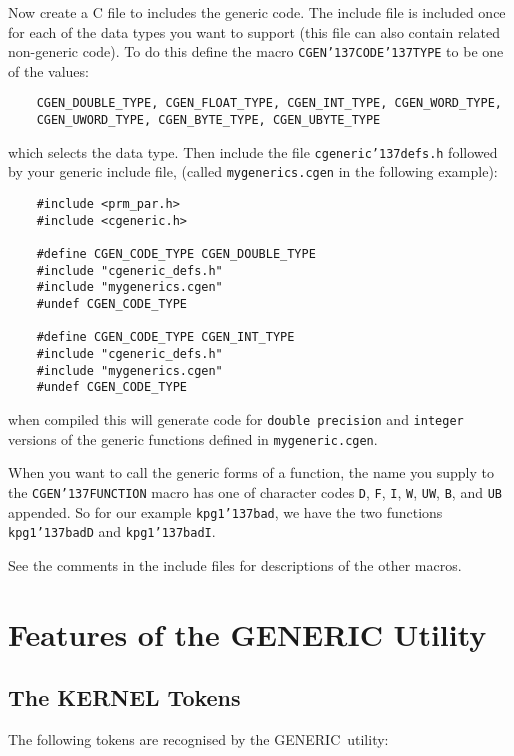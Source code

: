 \documentclass[twoside,11pt]{article}
\renewcommand{\_}{{\tt\char'137}}     %
\newcommand{\GENERIC}{{\footnotesize GENERIC}\normalsize}
\begin{document}
Now create a C file to includes the generic code. The include file is included
once for each of the data types you want to support (this file can also
contain related non-generic code).  To do this define the macro
{\tt CGEN\_CODE\_TYPE} to be one of the values:

\begin{verbatim}
    CGEN_DOUBLE_TYPE, CGEN_FLOAT_TYPE, CGEN_INT_TYPE, CGEN_WORD_TYPE,
    CGEN_UWORD_TYPE, CGEN_BYTE_TYPE, CGEN_UBYTE_TYPE
\end{verbatim}

which selects the data type. Then include the file {\tt cgeneric\_defs.h}
followed by your generic include file, (called {\tt mygenerics.cgen} in the
following example):

\begin{verbatim}
    #include <prm_par.h>
    #include <cgeneric.h>

    #define CGEN_CODE_TYPE CGEN_DOUBLE_TYPE
    #include "cgeneric_defs.h"
    #include "mygenerics.cgen"
    #undef CGEN_CODE_TYPE

    #define CGEN_CODE_TYPE CGEN_INT_TYPE
    #include "cgeneric_defs.h"
    #include "mygenerics.cgen"
    #undef CGEN_CODE_TYPE
\end{verbatim}

when compiled this will generate code for {\tt double precision}
and {\tt integer} versions of the generic functions defined in
{\tt mygeneric.cgen}.

When you want to call the generic forms of a function, the name you supply to
the {\tt CGEN\_FUNCTION} macro has one of character codes {\tt D}, {\tt F},
{\tt I}, {\tt W}, {\tt UW},  {\tt B}, and {\tt UB} appended.  So for our
example {\tt kpg1\_bad}, we have the two functions {\tt kpg1\_badD} and
{\tt kpg1\_badI}.

See the comments in the include files for descriptions of the other macros.

\section{Features of the GENERIC Utility}

\subsection{The KERNEL Tokens}

The following tokens are recognised by the \GENERIC\ utility:

\newlength{\numlen}
\settowidth{\numlen}{000000000000}
\settowidth{\labelsep}{000}
\end{document}
